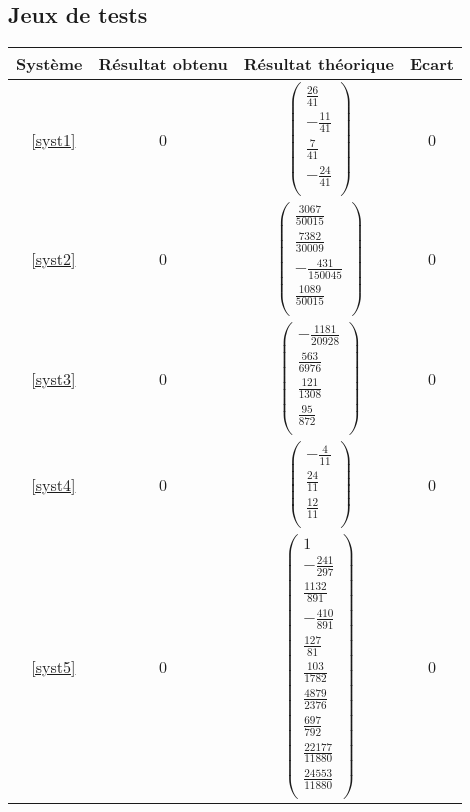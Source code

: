 \documentclass{report}
\begin{document}
      \subsection{Jeux de tests}
        \renewcommand{\arraystretch}{2}
        \begin{tabular}{|c|c|c|c|}
           \hline
           Système & Résultat obtenu & Résultat théorique & Ecart \\ %
           \hline
           ~\eqref{syst1} & 0 & $\begin{pmatrix}
				\frac{26}{41} \\
				-\frac{11}{41} \\
				\frac{7}{41} \\
				-\frac{24}{41} \\
			     \end{pmatrix}$         & 0 \\
	    \hline
           ~\eqref{syst2} & 0 & $\begin{pmatrix}
				\frac{3067}{50015} \\
				\frac{7382}{30009} \\
				-\frac{431}{150045} \\
				\frac{1089}{50015} \\
			     \end{pmatrix}$          & 0 \\
	    \hline
           ~\eqref{syst3} & 0 & $\begin{pmatrix}
				-\frac{1181}{20928} \\
				\frac{563}{6976} \\
				\frac{121}{1308} \\
				\frac{95}{872} \\
			     \end{pmatrix}$          & 0 \\
	    \hline
           ~\eqref{syst4} & 0 & $\begin{pmatrix}
				-\frac{4}{11} \\
				\frac{24}{11} \\
				\frac{12}{11} \\
			     \end{pmatrix}$          & 0 \\
	    \hline
           ~\eqref{syst5} & 0 & $\begin{pmatrix}
				1 \\
				-\frac{241}{297} \\
				\frac{1132}{891} \\
				-\frac{410}{891} \\
				\frac{127}{81} \\
				\frac{103}{1782} \\
				\frac{4879}{2376} \\
				\frac{697}{792} \\
				\frac{22177}{11880} \\
				\frac{24553}{11880} \\
			     \end{pmatrix}$          & 0 \\
	    \hline

         \end{tabular}
         \renewcommand{\arraystretch}{1}
\end{document}
